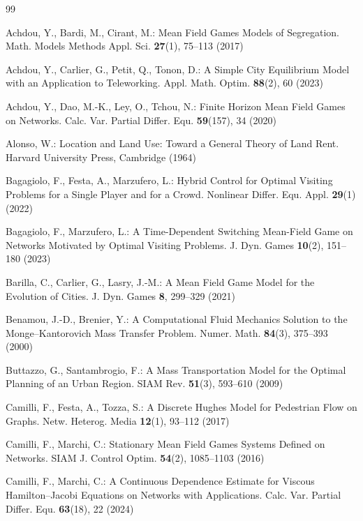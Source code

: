 \documentclass[smallextended,referee,envcountsect,]{svjour3}
\begin{document}
\begin{thebibliography}{99}

Achdou, Y., Bardi, M., Cirant, M.:
Mean Field Games Models of Segregation.
Math. Models Methods Appl. Sci. \textbf{27}(1), 75--113 (2017)

Achdou, Y., Carlier, G., Petit, Q., Tonon, D.:
A Simple City Equilibrium Model with an Application to Teleworking.
Appl. Math. Optim. \textbf{88}(2), 60 (2023)

Achdou, Y., Dao, M.-K., Ley, O., Tchou, N.:
Finite Horizon Mean Field Games on Networks.
Calc. Var. Partial Differ. Equ. \textbf{59}(157), 34 (2020)

Alonso, W.:
Location and Land Use: Toward a General Theory of Land Rent.
Harvard University Press, Cambridge (1964)

Bagagiolo, F., Festa, A., Marzufero, L.:
Hybrid Control for Optimal Visiting Problems for a Single Player and for a Crowd.
Nonlinear Differ. Equ. Appl. \textbf{29}(1) (2022)

Bagagiolo, F., Marzufero, L.:
A Time-Dependent Switching Mean-Field Game on Networks Motivated by Optimal Visiting Problems.
J. Dyn. Games \textbf{10}(2), 151--180 (2023)

Barilla, C., Carlier, G., Lasry, J.-M.:
A Mean Field Game Model for the Evolution of Cities.
J. Dyn. Games \textbf{8}, 299--329 (2021)

Benamou, J.-D., Brenier, Y.:
A Computational Fluid Mechanics Solution to the Monge--Kantorovich Mass Transfer Problem.
Numer. Math. \textbf{84}(3), 375--393 (2000)

Buttazzo, G., Santambrogio, F.:
A Mass Transportation Model for the Optimal Planning of an Urban Region.
SIAM Rev. \textbf{51}(3), 593--610 (2009)

Camilli, F., Festa, A., Tozza, S.:
A Discrete Hughes Model for Pedestrian Flow on Graphs.
Netw. Heterog. Media \textbf{12}(1), 93--112 (2017)

Camilli, F., Marchi, C.:
Stationary Mean Field Games Systems Defined on Networks.
SIAM J. Control Optim. \textbf{54}(2), 1085--1103 (2016)

Camilli, F., Marchi, C.:
A Continuous Dependence Estimate for Viscous Hamilton--Jacobi Equations on Networks with Applications.
Calc. Var. Partial Differ. Equ. \textbf{63}(18), 22 (2024)


\end{thebibliography}
\end{document}
